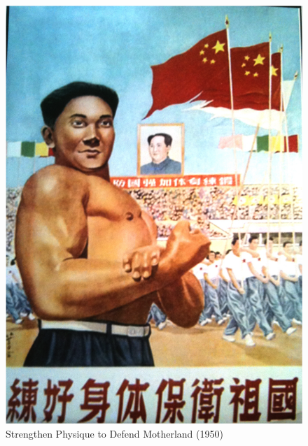 \begin{CJK}{UTF8}{gbsn}
\begin{figure}[htbp]
  \includegraphics[width = \linewidth,scale=.7]{images/motherlandStrength.png}
  \caption{Strengthen Physique to Defend Motherland (1950)}
  \label{fig:motherlandStrength}
\end{figure}


\end{CJK}
